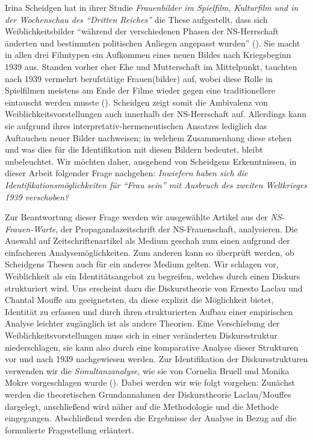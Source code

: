 \documentclass[12pt, titlepage=true, toc=bib]{scrartcl}
\begin{document}
Irina Scheidgen hat in ihrer Studie \textit{Frauenbilder im Spielfilm, Kulturfilm und in der Wochenschau des "`Dritten Reiches"'}  die These aufgestellt, dass sich Weiblichkeitsbilder "`während der verschiedenen Phasen der NS-Herrschaft änderten und bestimmten politischen Anliegen angepasst wurden"' (\cite*[260]{scheidgen_frauenbilder_2015}). Sie macht in allen drei Filmtypen ein Aufkommen eines neuen Bildes nach Kriegsbeginn 1939 aus. Standen vorher eher Ehe und Mutterschaft im Mittelpunkt, tauchten nach 1939 vermehrt berufstätige Frauen(bilder) auf, wobei diese Rolle in Spielfilmen meistens am Ende der Filme wieder gegen eine traditionellere eintauscht werden musste (\cite[vgl.][278]{scheidgen_frauenbilder_2015}). Scheidgen zeigt somit die Ambivalenz von Weiblichkeitsvorstellungen auch innerhalb der NS-Herrschaft auf. Allerdings kann sie aufgrund ihres interpretativ-hermeneutischen Ansatzes lediglich das Auftauchen neuer Bilder nachweisen; in welchem Zusammenhang diese stehen und was dies für die Identifikation mit diesen Bildern bedeutet, bleibt unbeleuchtet. Wir möchten daher, ausgehend von Scheidgens Erkenntnissen, in dieser Arbeit folgender Frage nachgehen: \textit{Inwiefern haben sich die Identifikationsmöglichkeiten für "`Frau sein"' mit Ausbruch des zweiten Weltkrieges 1939 verschoben?}

Zur Beantwortung dieser Frage werden wir ausgewählte Artikel aus der \textit{NS-Frauen-Warte}, der Propagandazeitschrift der NS-Frauenschaft, analysieren. Die Auswahl auf Zeitschriftenartikel als Medium geschah zum einen aufgrund der einfacheren Analysemöglichkeiten. Zum anderen kann so überprüft werden, ob Scheidgens Thesen auch für ein anderes Medium gelten. Wir schlagen vor, Weiblichkeit als ein Identitätsangebot zu begreifen, welches durch einen Diskurs strukturiert wird. Uns erscheint dazu die Diskurstheorie von Ernesto Laclau und Chantal Mouffe am geeignetsten, da diese explizit die Möglichkeit bietet, Identität zu erfassen und durch ihren strukturierten Aufbau einer empirischen Analyse leichter zugänglich ist als andere Theorien. Eine Verschiebung der Weiblichkeitsvorstellungen muss sich in einer veränderten Diskursstruktur niederschlagen, sie kann also durch eine komparative Analyse dieser Strukturen vor und nach 1939 nachgewiesen werden. Zur Identifikation der Diskursstrukturen verwenden wir die \textit{Simultanzanalyse}, wie sie von Cornelia Bruell und Monika Mokre vorgeschlagen wurde (\cite*{bruell_chancen_2006}). Dabei werden wir wie folgt vorgehen: Zunächst werden die theoretischen Grundannahmen der Diskurstheorie Laclau/Mouffes dargelegt, anschließend wird näher auf die Methodologie und die Methode eingegangen. Abschließend werden die Ergebnisse der Analyse in Bezug auf die formulierte Fragestellung erläutert.
\end{document}
